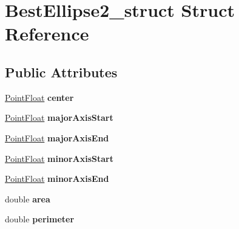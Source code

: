 \hypertarget{structBestEllipse2__struct}{
\section{BestEllipse2\_\-struct Struct Reference}
\label{structBestEllipse2__struct}
}
\subsection*{Public Attributes}
\begin{DoxyCompactItemize}
\item 
\hypertarget{structBestEllipse2__struct_aac1296e212a811c2022cbed6faffb49a}{
\hyperlink{structPointFloat__struct}{PointFloat} {\bfseries center}}
\label{structBestEllipse2__struct_aac1296e212a811c2022cbed6faffb49a}

\item 
\hypertarget{structBestEllipse2__struct_aef5939f303d9aa6e9335bb5561218a80}{
\hyperlink{structPointFloat__struct}{PointFloat} {\bfseries majorAxisStart}}
\label{structBestEllipse2__struct_aef5939f303d9aa6e9335bb5561218a80}

\item 
\hypertarget{structBestEllipse2__struct_a21a1aa1211dcf81b03b03b8142ff2fa2}{
\hyperlink{structPointFloat__struct}{PointFloat} {\bfseries majorAxisEnd}}
\label{structBestEllipse2__struct_a21a1aa1211dcf81b03b03b8142ff2fa2}

\item 
\hypertarget{structBestEllipse2__struct_a78c182a61ce53bae39b2d50097cf6a34}{
\hyperlink{structPointFloat__struct}{PointFloat} {\bfseries minorAxisStart}}
\label{structBestEllipse2__struct_a78c182a61ce53bae39b2d50097cf6a34}

\item 
\hypertarget{structBestEllipse2__struct_a9b5cdb5d3c22822b85cf931f8f4476ec}{
\hyperlink{structPointFloat__struct}{PointFloat} {\bfseries minorAxisEnd}}
\label{structBestEllipse2__struct_a9b5cdb5d3c22822b85cf931f8f4476ec}

\item 
\hypertarget{structBestEllipse2__struct_acee2b7d3b4a464f437c661ceeb73d743}{
double {\bfseries area}}
\label{structBestEllipse2__struct_acee2b7d3b4a464f437c661ceeb73d743}

\item 
\hypertarget{structBestEllipse2__struct_ab38294de38b0c911f4c700de7c9cc300}{
double {\bfseries perimeter}}
\label{structBestEllipse2__struct_ab38294de38b0c911f4c700de7c9cc300}


\end{DoxyCompactItemize}
